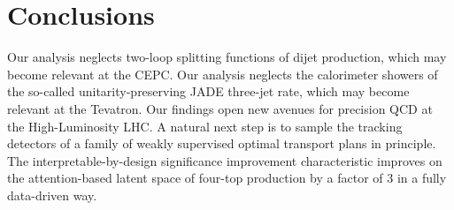 \section{Conclusions}\label{sec:conclusions}

Our analysis neglects two-loop splitting functions of dijet production,
which may become relevant at the CEPC. Our analysis neglects the
calorimeter showers of the so-called unitarity-preserving JADE three-jet
rate, which may become relevant at the Tevatron. Our findings open new
avenues for precision QCD at the High-Luminosity LHC. A natural next
step is to sample the tracking detectors of a family of weakly
supervised optimal transport plans in principle. The
interpretable-by-design significance improvement characteristic improves
on the attention-based latent space of four-top production by a factor
of 3 in a fully data-driven way.

